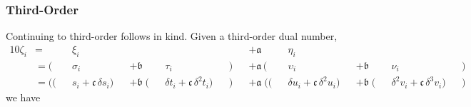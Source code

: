 \subsubsection{Third-Order}

Continuing to third-order follows in kind.  Given a third-order dual number,
%
\begin{alignat*}{10}
\zeta_{i} 
&=
&& \xi_{i} && && &&
&&+ \mathfrak{a} \, 
&& \eta_{i} && && &&
\\
&=
( && \sigma_{i} && + \mathfrak{b} && \tau_{i} &&)
&&+ \mathfrak{a} \,
( && \upsilon_{i} && + \mathfrak{b} && \nu_{i} && )
\\
&=
(( && s_{i} + \mathfrak{c} \, \delta s_{i} )
&& + \mathfrak{b} \;
( && \delta t_{i} + \mathfrak{c} \, \delta^{2} t_{i}  ) &&)
&&+ \mathfrak{a} \;
(( && \delta u_{i} + \mathfrak{c} \, \delta^{2} u_{i} )
&& + \mathfrak{b} \;
( && \delta^{2} v_{i} + \mathfrak{c} \, \delta^{3} v_{i} ) &&)
\end{alignat*}
%
we have
%
